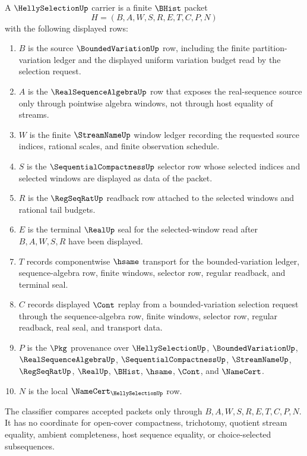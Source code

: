 \begin{definition}\label{def:helly-selection-carrier}
A $\HellySelectionUp$ carrier is a finite $\BHist$ packet
$$
H=(B,A,W,S,R,E,T,C,P,N)
$$
with the following displayed rows:
\begin{enumerate}
\item $B$ is the source $\BoundedVariationUp$ row, including the finite partition-variation ledger and the displayed uniform variation budget read by the selection request.
\item $A$ is the $\RealSequenceAlgebraUp$ row that exposes the real-sequence source only through pointwise algebra windows, not through host equality of streams.
\item $W$ is the finite $\StreamNameUp$ window ledger recording the requested source indices, rational scales, and finite observation schedule.
\item $S$ is the $\SequentialCompactnessUp$ selector row whose selected indices and selected windows are displayed as data of the packet.
\item $R$ is the $\RegSeqRatUp$ readback row attached to the selected windows and rational tail budgets.
\item $E$ is the terminal $\RealUp$ seal for the selected-window read after $B,A,W,S,R$ have been displayed.
\item $T$ records componentwise $\hsame$ transport for the bounded-variation ledger, sequence-algebra row, finite windows, selector row, regular readback, and terminal seal.
\item $C$ records displayed $\Cont$ replay from a bounded-variation selection request through the sequence-algebra row, finite windows, selector row, regular readback, real seal, and transport data.
\item $P$ is the $\Pkg$ provenance over $\HellySelectionUp$, $\BoundedVariationUp$, $\RealSequenceAlgebraUp$, $\SequentialCompactnessUp$, $\StreamNameUp$, $\RegSeqRatUp$, $\RealUp$, $\BHist$, $\hsame$, $\Cont$, and $\NameCert$.
\item $N$ is the local $\NameCert_{\HellySelectionUp}$ row.
\end{enumerate}
The classifier compares accepted packets only through $B,A,W,S,R,E,T,C,P,N$. It has no coordinate for open-cover compactness, trichotomy, quotient stream equality, ambient completeness, host sequence equality, or choice-selected subsequences.
\end{definition}

